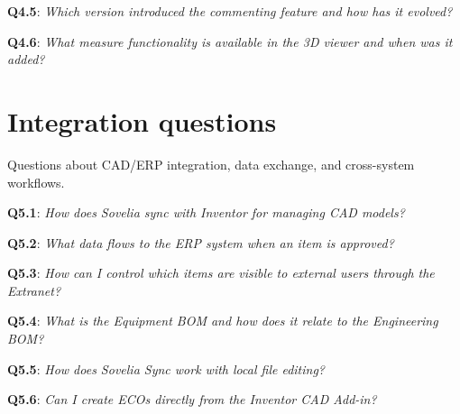 \textbf{Q4.5}: \textit{Which version introduced the commenting feature and how has it evolved?}

\textbf{Q4.6}: \textit{What measure functionality is available in the 3D viewer and when was it added?}

\section{Integration questions}
\label{app:category-integration-questions}

Questions about CAD/ERP integration, data exchange, and cross-system workflows.

\textbf{Q5.1}: \textit{How does Sovelia sync with Inventor for managing CAD models?}

\textbf{Q5.2}: \textit{What data flows to the ERP system when an item is approved?}

\textbf{Q5.3}: \textit{How can I control which items are visible to external users through the Extranet?}

\textbf{Q5.4}: \textit{What is the Equipment BOM and how does it relate to the Engineering BOM?}

\textbf{Q5.5}: \textit{How does Sovelia Sync work with local file editing?}

\textbf{Q5.6}: \textit{Can I create ECOs directly from the Inventor CAD Add-in?}
